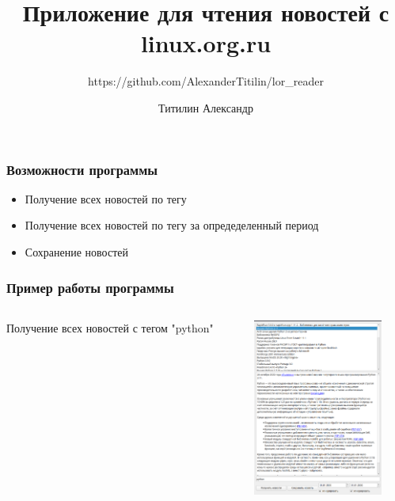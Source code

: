 \documentclass[aspectratio=169,12pt]{beamer}
\title{Приложение для чтения новостей с linux.org.ru}
\subtitle{https://github.com/AlexanderTitilin/lor\_reader}
\author{Титилин Александр}
\institute{СПбГЭУ}
\date{}
\begin{document}
\begin{frame}
    \titlepage
\end{frame}
\begin{frame}
    \frametitle{Возможности программы}
    \begin{itemize}
        \item Получение всех новостей по тегу
        \item Получение всех новостей по тегу за опредеделенный период
        \item Сохранение новостей
    \end{itemize}
\end{frame}
\begin{frame}
    \frametitle{Пример работы программы}
    \begin{columns}
        \begin{column}{0.34\textwidth}
            Получение всех новостей с тегом "python"
        \end{column}
        \begin{column}{0.56 \textwidth}
            \includegraphics[width = \textwidth,height=220]{python1.png}
        \end{column}
    \end{columns}
\end{frame}
\end{document}

